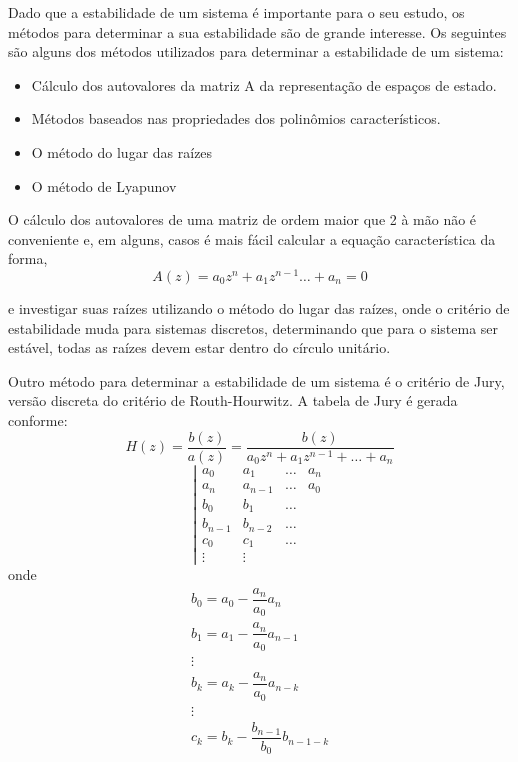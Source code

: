 Dado que a estabilidade de um sistema é importante para o seu estudo, os métodos para determinar a sua estabilidade são de grande interesse. Os seguintes são alguns dos métodos utilizados para determinar a estabilidade de um sistema:
\begin{itemize}
	\item Cálculo dos autovalores da matriz A da representação de espaços de estado.
	\item Métodos baseados nas propriedades dos polinômios característicos.
	\item O método do lugar das raízes
	\item O método de Lyapunov
\end{itemize}

O cálculo dos autovalores de uma matriz de ordem maior que 2 à mão não é conveniente e, em alguns, casos é mais fácil calcular a equação característica da forma,
\begin{equation}
A(z)=a_0z^n+a_1z^{n-1}\dots+a_n=0
\end{equation}

e investigar suas raízes utilizando o método do lugar das raízes, onde o critério de estabilidade muda para sistemas discretos, determinando que para o sistema ser estável, todas as raízes devem estar dentro do círculo unitário.

Outro método para determinar a estabilidade de um sistema é o critério de Jury, versão discreta do critério de Routh-Hourwitz. A tabela de Jury é gerada conforme:
\begin{equation}
H(z)=\dfrac{b(z)}{a(z)}=\dfrac{b(z)}{a_0 z^n+a_1 z^{n-1}+\dots+a_n}
\end{equation}
\begin{equation}
\left|
\begin{matrix}
a_0 & a_1& \dots & a_n\\
a_n & a_{n-1}& \dots & a_0\\
b_0 & b_1 & \dots \\
b_{n-1} & b_{n-2} & \dots \\
c_0 & c_1 & \dots \\
\vdots & \vdots
\end{matrix}
\right.
\end{equation}
onde
\begin{equation}
\begin{matrix}
b_0=a_0- \dfrac{a_n}{a_0}a_n\\
b_1=a_1- \dfrac{a_n}{a_0}a_{n-1}\\
\vdots \\
b_k=a_k- \dfrac{a_n}{a_0}a_{n-k}\\
\vdots \\
c_k=b_k- \dfrac{b_{n-1}}{b_0}b_{n-1-k}\\
\end{matrix}
\end{equation}

